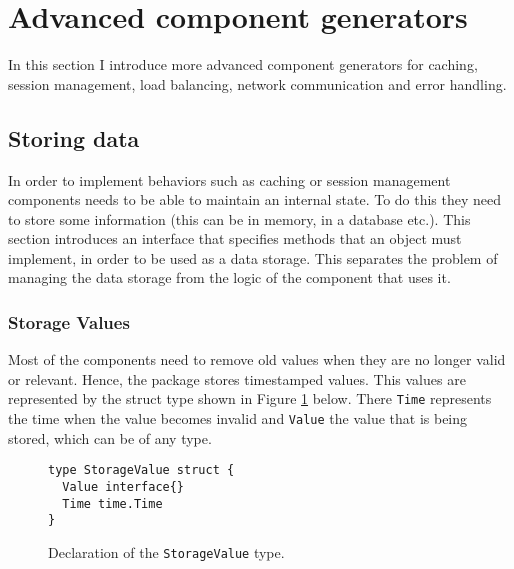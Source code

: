 \section{Advanced component generators}
\label{sec:impl2}
In this section I introduce more advanced component generators for caching,
session management, load balancing, network communication and error handling.

\subsection{Storing data}
In order to implement behaviors such as caching or session management
components needs to be able to maintain an internal state.
To do this they need to store some information (this can be in memory, 
in a database etc.).
This section introduces an interface that specifies methods that an 
object must implement, in order to be used as a data storage. This 
separates the problem of managing the data storage from the logic of
the component that uses it.

\subsubsection{Storage Values}
Most of the components need to remove old values when they are no longer
valid or relevant. Hence, the package stores timestamped values. 
This values are represented by the struct type shown in Figure 
\ref{fig:StorageValue} below. There \texttt{Time} represents the time 
when the value becomes invalid and \texttt{Value} the value that is being
stored, which can be of any type.
\begin{figure}[h]
\centering
\begin{lstlisting}
type StorageValue struct {
  Value interface{}
  Time time.Time
}
\end{lstlisting}
\caption[scale=1.0]{Declaration of the \texttt{StorageValue} type.}
\label{fig:StorageValue}
\end{figure}

